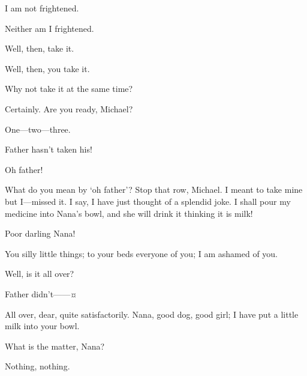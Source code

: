 \begin{drama}
\michaelspeaks
I am not frightened.

\mrdarlingspeaks
Neither am I frightened.

\michaelspeaks
Well, then, take it.

\mrdarlingspeaks
Well, then, you take it.

Why not take it at the same time?

Certainly.
Are you ready, Michael?

One—two—three.


\johnspeaks
Father hasn’t taken his!


Oh father!

What do you mean by ‘oh father’?
Stop that row, Michael.
I meant to take mine but I—missed it.
I say, I have just thought of a splendid joke.
I shall pour my medicine into Nana’s bowl, and she will drink it thinking it is milk!

\wendyspeaks
Poor darling Nana!

\mrdarlingspeaks
You silly little things; to your beds everyone of you; I am ashamed of you.


\mrsdarlingspeaks
Well, is it all over?

\michaelspeaks
Father didn’t——¤

\mrdarlingspeaks
All over, dear, quite satisfactorily.
Nana, good dog, good girl; I have put a little milk into your bowl.

\mrsdarlingspeaks
What is the matter, Nana?

Nothing, nothing.


\end{drama}
